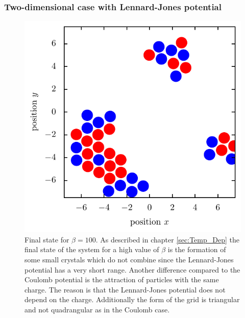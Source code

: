 \documentclass[11pt, a4paper]{article}
\numberwithin{equation}{section}
\begin{document}
\subsubsection{Two-dimensional case with Lennard-Jones potential}

\begin{figure}[!h]
\centering
\includegraphics[scale=1]{figures/Beta_100_LJ.pdf}
\caption{Final state for $\beta = 100$.
As described in chapter \ref{sec:Temp_Dep} the final state of the system for a high value of $\beta$ is the formation of some small crystals which do not combine since the Lennard-Jones potential has a very short range.
Another difference compared to the Coulomb potential is the attraction of particles with the same charge.
The reason is that the Lennard-Jones potential does not depend on the charge.
Additionally the form of the grid is triangular and not quadrangular as in the Coulomb case.
}
\end{figure}
\end{document}
